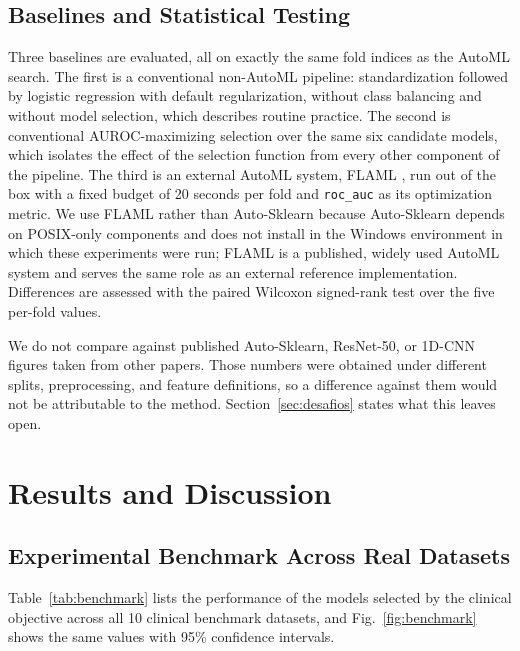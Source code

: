 \documentclass[conference]{IEEEtran}
\begin{document}
\subsection{Baselines and Statistical Testing}
Three baselines are evaluated, all on exactly the same fold indices as the AutoML search. The first is a conventional non-AutoML pipeline: standardization followed by logistic regression with default regularization, without class balancing and without model selection, which describes routine practice. The second is conventional AUROC-maximizing selection over the same six candidate models, which isolates the effect of the selection function from every other component of the pipeline. The third is an external AutoML system, FLAML \cite{flaml2021}, run out of the box with a fixed budget of 20 seconds per fold and \texttt{roc\_auc} as its optimization metric. We use FLAML rather than Auto-Sklearn because Auto-Sklearn depends on POSIX-only components and does not install in the Windows environment in which these experiments were run; FLAML is a published, widely used AutoML system and serves the same role as an external reference implementation. Differences are assessed with the paired Wilcoxon signed-rank test over the five per-fold values.

We do not compare against published Auto-Sklearn, ResNet-50, or 1D-CNN figures taken from other papers. Those numbers were obtained under different splits, preprocessing, and feature definitions, so a difference against them would not be attributable to the method. Section~\ref{sec:desafios} states what this leaves open.

\section{Results and Discussion}

\subsection{Experimental Benchmark Across Real Datasets}
Table~\ref{tab:benchmark} lists the performance of the models selected by the clinical objective across all 10 clinical benchmark datasets, and Fig.~\ref{fig:benchmark} shows the same values with 95\% confidence intervals.
\end{document}
